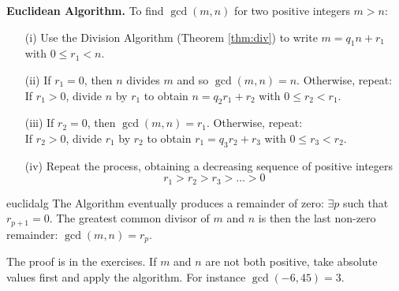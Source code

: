 {\bf Euclidean Algorithm.} To find $\gcd(m,n)$ for two positive integers $m>n$:

\begin{itemize}
\item[(i)] Use the Division Algorithm (Theorem \ref{thm:div}) to write $m=q_1n+r_1$ with $0\le r_1<n$.
\item[(ii)] If $r_1=0$, then $n$ divides $m$ and so $\gcd(m,n)=n$. Otherwise, repeat:\\
	If $r_1>0$, divide $n$ by $r_1$ to obtain $n=q_2r_1+r_2$ with $0\le r_2<r_1$.
\item[(iii)] If $r_2=0$, then $\gcd(m,n)=r_1$. Otherwise, repeat:\\
	If $r_2>0$, divide $r_1$ by $r_2$ to obtain $r_1=q_3r_2+r_3$ with $0\le r_3<r_2$.
\item[(iv)] Repeat the process, obtaining a decreasing sequence of positive integers
\[r_1>r_2>r_3>\ldots>0\]
\end{itemize}


\begin{thm}{}{euclidalg}
The Algorithm eventually produces a remainder of zero: $\exists p$ such that $r_{p+1}=0$. The greatest common divisor of $m$ and $n$ is then the last non-zero remainder: $\gcd(m,n)=r_p$.
\end{thm}

 The proof is in the exercises. If $m$ and $n$ are not both positive, take absolute values first and apply the algorithm. For instance $\gcd(-6,45)=3$.

